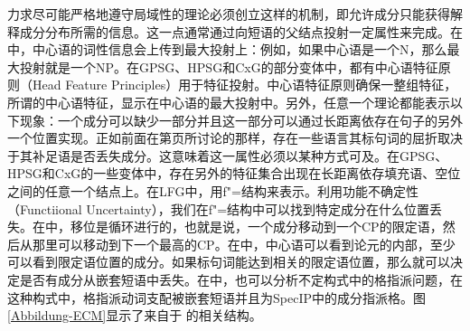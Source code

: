 力求尽可能严格地遵守局域性的理论必须创立这样的机制，即允许成分只能获得解释成分分布所需的信息。这一点通常通过向短语的父结点投射一定属性来完成。在\xbartc 中，中心语的词性信息会上传到最大投射上：例如，如果中心语是一个N，那么最大投射就是一个NP。在GPSG、HPSG和CxG的部分变体中，都有中心语特征原则（Head Feature Principles）用于特征投射。中心语特征原则确保一整组特征，所谓的中心语特征，显示在中心语的最大投射中。另外，任意一个理论都能表示以下现象：一个成分可以缺少一部分并且这一部分可以通过长距离依存在句子的另外一个位置实现。正如前面在第\pageref{page-Irish-complementizers}页所讨论的那样，存在一些语言其标句词的屈折取决于其补足语是否丢失成分。这意味着这一属性必须以某种方式可及。在GPSG、HPSG和CxG的一些变体中，存在另外的特征集合出现在长距离依存填充语、空位之间的任意一个结点上。在LFG中，用f"=结构来表示。利用功能不确定性（Functiional Uncertainty），我们在f"=结构中可以找到特定成分在什么位置丢失。在\gbtc 中，移位是循环进行的，也就是说，一个成分移动到一个CP的限定语，然后从那里可以移动到下一个最高的CP。在\gbtc 中，中心语可以看到论元的内部，至少可以看到限定语位置的成分。如果标句词能达到相关的限定语位置，那么就可以决定是否有成分从嵌套短语中丢失。在\gbtc 中，也可以分析不定构式中的格指派问题，在这种构式中，格指派动词支配被嵌套短语并且为\mbox{SpecIP}中的成分指派格。图\ref{Abbildung-ECM}显示了来自于 的相关结构。
